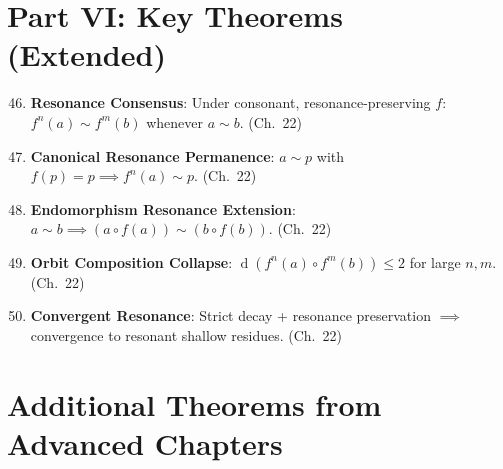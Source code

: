 \documentclass[11pt,openany]{book}
\theoremstyle{definition}
\theoremstyle{plain}
\theoremstyle{remark}
\newcommand{\compose}{\circ}                 %
\newcommand{\res}{\sim}                      %
\newcommand{\depth}{\operatorname{d}}       %
\begin{document}
\section{Part VI: Key Theorems (Extended)}

\begin{enumerate}
\setcounter{enumi}{45}
\item \textbf{Resonance Consensus}: Under consonant, resonance-preserving $f$: $f^n(a) \res f^m(b)$ whenever $a \res b$. (Ch.~22)
\item \textbf{Canonical Resonance Permanence}: $a \res p$ with $f(p) = p \implies f^n(a) \res p$. (Ch.~22)
\item \textbf{Endomorphism Resonance Extension}: $a \res b \implies (a \compose f(a)) \res (b \compose f(b))$. (Ch.~22)
\item \textbf{Orbit Composition Collapse}: $\depth(f^n(a) \compose f^m(b)) \leq 2$ for large $n, m$. (Ch.~22)
\item \textbf{Convergent Resonance}: Strict decay + resonance preservation $\implies$ convergence to resonant shallow residues. (Ch.~22)
\end{enumerate}

\section{Additional Theorems from Advanced Chapters}
\end{document}
